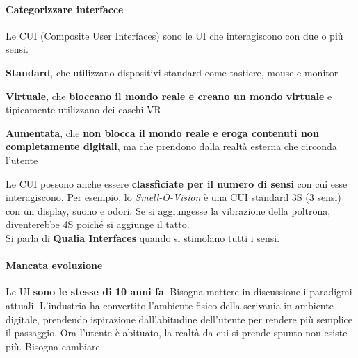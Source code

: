 \documentclass[10pt]{article}
\begin{document}
\paragraph{Categorizzare interfacce} Le CUI (Composite User Interfaces) sono le UI che interagiscono con due o più sensi.
\begin{list}{}{Esistono tre diverse macrocategorie di CUI:}
\item \textbf{Standard}, che utilizzano dispositivi standard come tastiere, mouse e monitor
\item \textbf{Virtuale}, che \textbf{bloccano il mondo reale e creano un mondo virtuale} e tipicamente utilizzano dei caschi VR
\item \textbf{Aumentata}, che \textbf{non blocca il mondo reale e eroga contenuti non completamente digitali}, ma che prendono dalla realtà esterna che circonda l'utente
\end{list}
Le CUI possono anche essere \textbf{classficiate per il numero di sensi} con cui esse interagiscono. Per esempio, lo \textit{Smell-O-Vision} è una CUI standard 3S (3 sensi) con un display, suono e odori. Se si aggiungesse la vibrazione della poltrona, diventerebbe 4S poiché si aggiunge il tatto.\\
Si parla di \textbf{Qualia Interfaces} quando si stimolano tutti i sensi.
\paragraph{Mancata evoluzione} Le UI \textbf{sono le stesse di 10 anni fa}. Bisogna mettere in discussione i paradigmi attuali. L'industria ha convertito l'ambiente fisico della scrivania in ambiente digitale, prendendo ispirazione dall'abitudine dell'utente per rendere più semplice il passaggio. Ora l'utente è abituato, la realtà da cui si prende spunto non esiste più. Bisogna cambiare.
\end{document}
